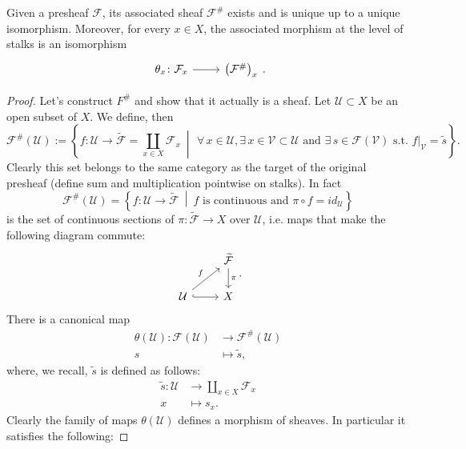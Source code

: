 \documentclass[../Main]{subfiles}
\begin{document}
\begin{thm}[]
	Given a presheaf $\mathcal{F}$, its associated sheaf $\mathcal{F}^\#$ exists and
	is unique up to a unique isomorphism.
	Moreover, for every $x \in X$, the associated morphism at the level of stalks is an isomorphism
	\begin{equation}
		\begin{tikzcd}
			\theta_x\colon \mathcal{F}_x \arrow[r, "", rightarrow] &
		\left( \mathcal{F}^\# \right)_x
		\end{tikzcd}
	.\end{equation} 
\end{thm}
\begin{proof}
	Let's construct $F^\#$ and show that it actually is a sheaf.
	Let $\mathcal{U} \subset X$ be an open subset of $X$.
	We define, then
	\begin{equation}
		\mathcal{F}^\#(\mathcal{U}) :=
		\left\{ f\colon \mathcal{U} \to \widetilde{\mathcal{F}} = \coprod_{x \in X} \mathcal{F}_x \ \middle|\ 
		\,\forall\, x \in \mathcal{U}, \exists\, x \in \mathcal{V} \subset \mathcal{U} \text{ and } 
		\exists\, s \in \mathcal{F}(\mathcal{V}) \text{ s.t. } \left.f\right|_{\mathcal{V}} = \tilde{s} \right\}
	.\end{equation} 
	Clearly this set belongs to the same category as the target of the original presheaf
	(define sum and multiplication pointwise on stalks).
	In fact
	\begin{equation}
		\mathcal{F}^\#(\mathcal{U}) = \left\{ 
		f\colon \mathcal{U} \to \widetilde{\mathcal{F}} \ \middle|\ f  \text{ is continuous and }
	\pi \circ f = id_{\mathcal{U}} \right\}
	\end{equation} 
	is the set of continuous sections of $\pi\colon \widetilde{\mathcal{F}} \to X$
	over $\mathcal{U}$, i.e.
	maps that make the following diagram commute:
	\begin{equation}
	\begin{tikzcd}
		&
		\widetilde{\mathcal{F}} \arrow[d, "\pi", rightarrow] \\
		\mathcal{U} \arrow[ur, "f", rightarrow] \arrow[r, "", hookrightarrow] &
		X
	\end{tikzcd}
	.\end{equation} 
	There is a canonical map
	\begin{align}
		\theta(\mathcal{U}): \mathcal{F}(\mathcal{U}) &\longrightarrow \mathcal{F}^\#(\mathcal{U}) \\
		s &\longmapsto \tilde{s} \nonumber
	,\end{align} 
	where, we recall, $\tilde{s}$ is defined as follows:
	\begin{align}
		\tilde{s}: \mathcal{U} &\longrightarrow \coprod_{x \in X}\mathcal{F}_x \\
		x &\longmapsto s_x \nonumber
	.\end{align} 
	Clearly the family of maps $\theta(\mathcal{U})$ defines a morphism of sheaves.
	In particular it satisfies the following:


\end{proof}
\end{document}
